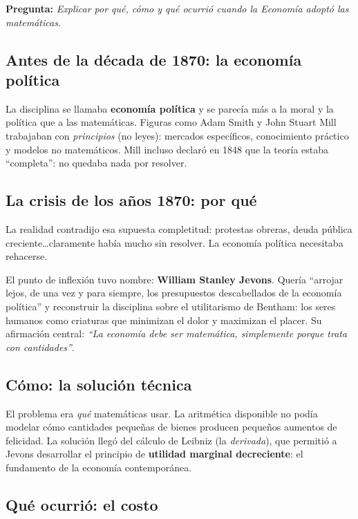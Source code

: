 \documentclass[a4paper,12pt]{article}
\begin{document}
\textbf{Pregunta:} \textit{Explicar por qué, cómo y qué ocurrió cuando la Economía adoptó las matemáticas.}

\subsection*{Antes de la década de 1870: la economía política}

La disciplina se llamaba \textbf{economía política} y se parecía más a la moral y la política que a las matemáticas. Figuras como Adam Smith y John Stuart Mill trabajaban con \textit{principios} (no leyes): mercados específicos, conocimiento práctico y modelos no matemáticos. Mill incluso declaró en 1848 que la teoría estaba ``completa'': no quedaba nada por resolver.

\subsection*{La crisis de los años 1870: por qué}

La realidad contradijo esa supuesta completitud: protestas obreras, deuda pública creciente\ldots claramente había mucho sin resolver. La economía política necesitaba rehacerse.

El punto de inflexión tuvo nombre: \textbf{William Stanley Jevons}. Quería ``arrojar lejos, de una vez y para siempre, los presupuestos descabellados de la economía política'' y reconstruir la disciplina sobre el utilitarismo de Bentham: los seres humanos como criaturas que minimizan el dolor y maximizan el placer. Su afirmación central: \textit{``La economía debe ser matemática, simplemente porque trata con cantidades''}.

\subsection*{Cómo: la solución técnica}

El problema era \textit{qué} matemáticas usar. La aritmética disponible no podía modelar cómo cantidades pequeñas de bienes producen pequeños aumentos de felicidad. La solución llegó del cálculo de Leibniz (la \textit{derivada}), que permitió a Jevons desarrollar el principio de \textbf{utilidad marginal decreciente}: el fundamento de la economía contemporánea.

\subsection*{Qué ocurrió: el costo}
\end{document}
